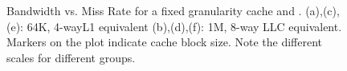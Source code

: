 {\begin{figure}[ht]
    

  \caption[Bandwidth vs. Miss Rate]{Bandwidth vs. Miss Rate for a fixed granularity cache and \AC{}. (a),(c),(e): 64K, 4-wayL1 equivalent (b),(d),(f): 1M, 8-way LLC equivalent.  Markers on the plot indicate cache block size. Note the different scales for different groups.}
  \label{fig:eval_scatter_bw_64k_1m}
\end{figure}

}
